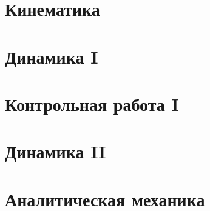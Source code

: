 




% 
% 

\newpage

\section{Кинематика}






\section{Динамика I}
\setcounter{subsection}{4}



% 
\section{Контрольная работа I}




\section{Динамика II}
\setcounter{subsection}{7}

\section{Аналитическая механика}
\setcounter{subsection}{9}


% 

